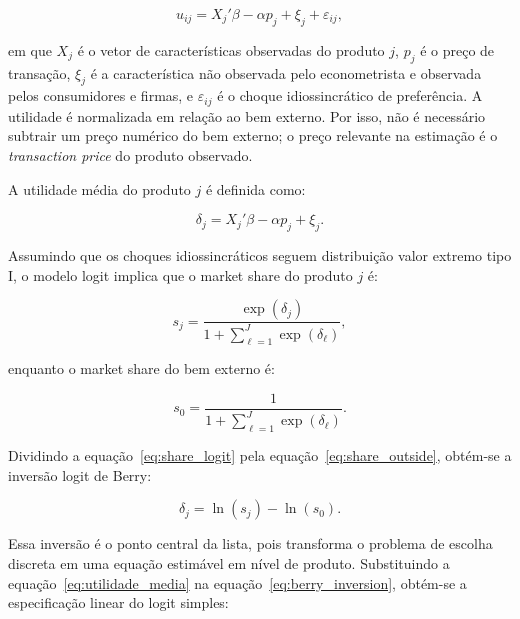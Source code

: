 \documentclass[12pt,a4paper]{article}
\begin{document}
\begin{equation}
    u_{ij}
    =
    X_j'\beta
    -
    \alpha p_j
    +
    \xi_j
    +
    \varepsilon_{ij},
    \label{eq:utilidade_indireta}
\end{equation}

em que \(X_j\) é o vetor de características observadas do produto \(j\), \(p_j\) é o preço de transação, \(\xi_j\) é a característica não observada pelo econometrista e observada pelos consumidores e firmas, e \(\varepsilon_{ij}\) é o choque idiossincrático de preferência. A utilidade é normalizada em relação ao bem externo. Por isso, não é necessário subtrair um preço numérico do bem externo; o preço relevante na estimação é o \textit{transaction price} do produto observado.

A utilidade média do produto \(j\) é definida como:

\begin{equation}
    \delta_j
    =
    X_j'\beta
    -
    \alpha p_j
    +
    \xi_j.
    \label{eq:utilidade_media}
\end{equation}

Assumindo que os choques idiossincráticos seguem distribuição valor extremo tipo I, o modelo logit implica que o market share do produto \(j\) é:

\begin{equation}
    s_j
    =
    \frac{\exp(\delta_j)}
    {1 + \sum_{\ell=1}^{J}\exp(\delta_{\ell})},
    \label{eq:share_logit}
\end{equation}

enquanto o market share do bem externo é:

\begin{equation}
    s_0
    =
    \frac{1}
    {1 + \sum_{\ell=1}^{J}\exp(\delta_{\ell})}.
    \label{eq:share_outside}
\end{equation}

Dividindo a equação~\eqref{eq:share_logit} pela equação~\eqref{eq:share_outside}, obtém-se a inversão logit de Berry:

\begin{equation}
    \delta_j
    =
    \ln(s_j)
    -
    \ln(s_0).
    \label{eq:berry_inversion}
\end{equation}

Essa inversão é o ponto central da lista, pois transforma o problema de escolha discreta em uma equação estimável em nível de produto. Substituindo a equação~\eqref{eq:utilidade_media} na equação~\eqref{eq:berry_inversion}, obtém-se a especificação linear do logit simples:
\end{document}
